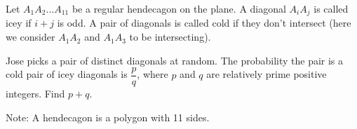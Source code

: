Let $A_1A_2\dots A_{11}$ be a regular hendecagon on the plane. A diagonal $A_iA_j$ is called icey if $i + j$ is odd. A pair of diagonals is called cold if they don't intersect (here we consider $A_1A_2$ and $A_1A_3$ to be intersecting).



Jose picks a pair of distinct diagonals at random. The probability the pair is a cold pair of icey diagonals is $\dfrac{p}{q}$, where $p$ and $q$ are relatively prime positive integers. Find $p+q$.



Note: A hendecagon is a polygon with 11 sides.
